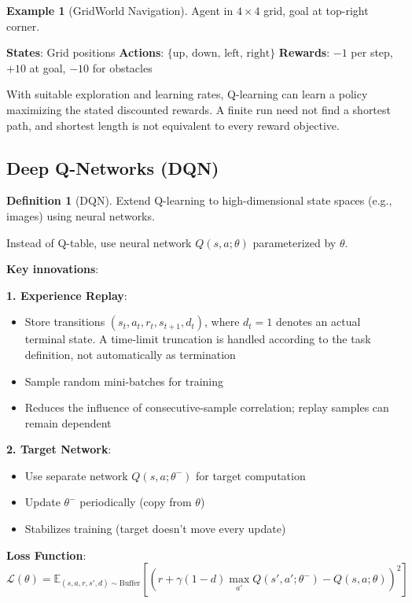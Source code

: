 \documentclass[11pt,twoside]{article}
\numberwithin{equation}{section}
\newcommand{\E}{\mathbb{E}}
\newcommand{\Loss}{\mathcal{L}}
\theoremstyle{plain}
\theoremstyle{definition}
\newtheorem{definition}[theorem]{Definition}
\newtheorem{example}[theorem]{Example}
\theoremstyle{remark}
\begin{document}
\begin{example}[GridWorld Navigation]
Agent in $4 \times 4$ grid, goal at top-right corner.

\textbf{States}: Grid positions
\textbf{Actions}: $\{\text{up, down, left, right}\}$
\textbf{Rewards}: $-1$ per step, $+10$ at goal, $-10$ for obstacles

With suitable exploration and learning rates, Q-learning can learn a policy maximizing the stated discounted rewards. A finite run need not find a shortest path, and shortest length is not equivalent to every reward objective.
\end{example}

\subsection{Deep Q-Networks (DQN)}

\begin{definition}[DQN]
Extend Q-learning to high-dimensional state spaces (e.g., images) using neural networks.

Instead of Q-table, use neural network $Q(s, a; \theta)$ parameterized by $\theta$.

\textbf{Key innovations}:

\textbf{1. Experience Replay}:
\begin{itemize}
\item Store transitions $(s_t,a_t,r_t,s_{t+1},d_t)$, where $d_t=1$ denotes an actual terminal state. A time-limit truncation is handled according to the task definition, not automatically as termination
\item Sample random mini-batches for training
\item Reduces the influence of consecutive-sample correlation; replay samples can remain dependent
\end{itemize}

\textbf{2. Target Network}:
\begin{itemize}
\item Use separate network $Q(s, a; \theta^-)$ for target computation
\item Update $\theta^-$ periodically (copy from $\theta$)
\item Stabilizes training (target doesn't move every update)
\end{itemize}

\textbf{Loss Function}:
\[
\Loss(\theta)=\E_{(s,a,r,s',d)\sim\text{Buffer}}
\left[\left(r+\gamma(1-d)\max_{a'}Q(s',a';\theta^-)-Q(s,a;\theta)\right)^2\right]
\]
\end{definition}
\end{document}
